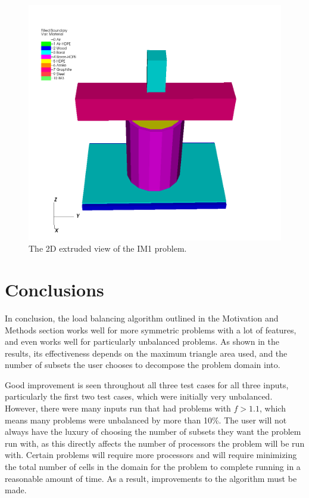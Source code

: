 \documentclass{anstrans}
\begin{document}
\begin{figure}
\centering
\includegraphics[scale = 0.3,trim= 0cm 0cm 0cm 3cm, clip]{figures/IM1_3D.png}
\caption{The 2D extruded view of the IM1 problem.}
\label{IM13D}
\end{figure}



\section{Conclusions}

In conclusion, the load balancing algorithm outlined in the Motivation and Methods section works well for more symmetric problems with a lot of features, and even works well for particularly unbalanced problems. As shown in the results, its effectiveness depends on the maximum triangle area used, and the number of subsets the user chooses to decompose the problem domain into. 

Good improvement is seen throughout all three test cases for all three inputs, particularly the first two test cases, which were initially very unbalanced. However, there were many inputs run that had problems with $f > 1.1$, which means many problems were unbalanced by more than 10\%. The user will not always have the luxury of choosing the number of subsets they want the problem run with, as this directly affects the number of processors the problem will be run with. Certain problems will require more processors and will require minimizing the total number of cells in the domain for the problem to complete running in a reasonable amount of time. As a result, improvements to the algorithm must be made. 
\end{document}
